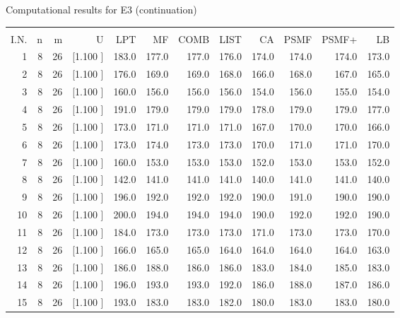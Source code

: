 \documentclass[12pt,a4paper]{article}
\begin{document}
\newpage
\begin{center}
 Computational results for E3 (continuation) {\tiny
\begin{tabular}{r r r r r r r r r r r r}\hline
    &   &   &          &        &        &        &        &        &        &        &       \\[-0.1in]
  I.N.  &  n  &  m  &  U  &  LPT  &  MF  &  COMB  &  LIST  &  CA  & PSMF &PSMF+ & LB \\[0.03in]
\hline
   1&  8& 26&[1.100     ]&   183.0&   177.0&   177.0&   176.0&   174.0&   174.0&   174.0&   173.0\\[-0.02in]
   2&  8& 26&[1.100     ]&   176.0&   169.0&   169.0&   168.0&   166.0&   168.0&   167.0&   165.0\\[-0.02in]
   3&  8& 26&[1.100     ]&   160.0&   156.0&   156.0&   156.0&   154.0&   156.0&   155.0&   154.0\\[-0.02in]
   4&  8& 26&[1.100     ]&   191.0&   179.0&   179.0&   179.0&   178.0&   179.0&   179.0&   177.0\\[-0.02in]
   5&  8& 26&[1.100     ]&   173.0&   171.0&   171.0&   171.0&   167.0&   170.0&   170.0&   166.0\\[-0.02in]
   6&  8& 26&[1.100     ]&   173.0&   174.0&   173.0&   173.0&   170.0&   171.0&   171.0&   170.0\\[-0.02in]
   7&  8& 26&[1.100     ]&   160.0&   153.0&   153.0&   153.0&   152.0&   153.0&   153.0&   152.0\\[-0.02in]
   8&  8& 26&[1.100     ]&   142.0&   141.0&   141.0&   141.0&   140.0&   141.0&   141.0&   140.0\\[-0.02in]
   9&  8& 26&[1.100     ]&   196.0&   192.0&   192.0&   192.0&   190.0&   191.0&   190.0&   190.0\\[-0.02in]
  10&  8& 26&[1.100     ]&   200.0&   194.0&   194.0&   194.0&   190.0&   192.0&   192.0&   190.0\\[-0.02in]
  11&  8& 26&[1.100     ]&   184.0&   173.0&   173.0&   173.0&   171.0&   173.0&   173.0&   170.0\\[-0.02in]
  12&  8& 26&[1.100     ]&   166.0&   165.0&   165.0&   164.0&   164.0&   164.0&   164.0&   163.0\\[-0.02in]
  13&  8& 26&[1.100     ]&   186.0&   188.0&   186.0&   186.0&   183.0&   184.0&   185.0&   183.0\\[-0.02in]
  14&  8& 26&[1.100     ]&   196.0&   193.0&   193.0&   192.0&   186.0&   188.0&   187.0&   186.0\\[-0.02in]
  15&  8& 26&[1.100     ]&   193.0&   183.0&   183.0&   182.0&   180.0&   183.0&   183.0&   180.0\\[-0.02in]

\end{tabular}}
\end{center}
\end{document}
